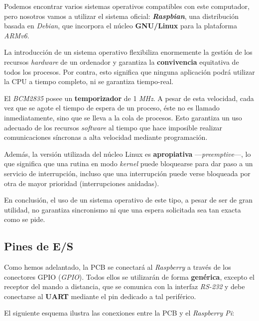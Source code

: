Podemos encontrar varios sistemas operativos compatibles con este computador, pero nosotros vamos a utilizar el sistema oficial: \textbf{\textit{Raspbian}}, una distribución basada en \textit{Debian}, que incorpora el núcleo \textbf{GNU/Linux} para la plataforma \textit{ARMv6}.

La introducción de un sistema operativo flexibiliza enormemente la gestión de los recursos \textit{hardware} de un ordenador y garantiza la \textbf{convivencia} equitativa de todos los procesos. Por contra, esto significa que ninguna aplicación podrá utilizar la \acrshort{CPU} a tiempo completo, ni se garantiza tiempo-real.

El \textit{BCM2835} posee un \textbf{temporizador} de 1 \textit{MHz}. A pesar de esta velocidad, cada vez que se agote el tiempo de espera de un proceso, éste no es llamado inmediatamente, sino que se lleva a la cola de procesos. Esto garantiza un uso adecuado de los recursos \textit{software} al tiempo que hace imposible realizar comunicaciones síncronas a alta velocidad mediante programación.

Además, la versión utilizada del núcleo Linux es \textbf{apropiativa} ---\textit{preemptive}---, lo que significa que una rutina en modo \textit{kernel} puede bloquearse para dar paso a un servicio de interrupción, incluso que una interrupción puede verse bloqueada por otra de mayor prioridad (interrupciones anidadas).

En conclusión, el uso de un sistema operativo de este tipo, a pesar de ser de gran utilidad, no garantiza sincronismo ni que una espera solicitada sea tan exacta como se pide.

\subsection{Pines de E/S}

Como hemos adelantado, la \acrshort{PCB} se conectará al \textit{Raspberry} a través de los conectores \acrshort{GPIO} (\textit{\acrlong{GPIO}}). Todos ellos se utilizarán de forma \textbf{genérica}, excepto el receptor del mando a distancia, que se comunica con la interfaz \textit{RS-232} y debe conectarse al \textbf{\acrshort{UART}} mediante el pin dedicado a tal periférico.

El siguiente esquema ilustra las conexiones entre la \acrshort{PCB} y el \textit{Raspberry Pi}:

\smallskip

